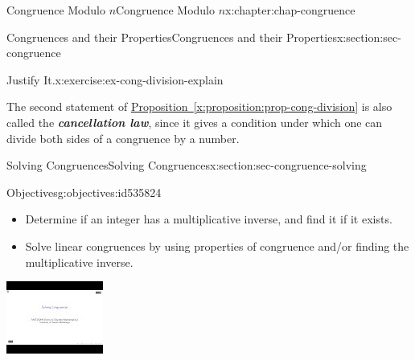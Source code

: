 \documentclass[oneside,10pt,]{book}
\newcommand{\xreffont}{\relax}
\newcommand{\alert}[1]{\textbf{\textit{#1}}}
\numberwithin{equation}{section}
\newlength{\qrsize}
\newlength{\previewwidth}
\begin{document}
\begin{chapterptx}{Congruence Modulo \(n\)}{}{Congruence Modulo \(n\)}{}{}{x:chapter:chap-congruence}
\begin{sectionptx}{Congruences and their Properties}{}{Congruences and their Properties}{}{}{x:section:sec-congruence}
\begin{inlineexercise}{Justify It.}{x:exercise:ex-cong-division-explain}
\end{inlineexercise}%
The second statement of \hyperref[x:proposition:prop-cong-division]{Proposition~{\xreffont\ref{x:proposition:prop-cong-division}}} is also called the \alert{cancellation law}, since it gives a condition under which one can divide both sides of a congruence by a number.%
\end{sectionptx}
%
%
\typeout{************************************************}
\typeout{************************************************}
%
\begin{sectionptx}{Solving Congruences}{}{Solving Congruences}{}{}{x:section:sec-congruence-solving}
\begin{objectives}{Objectives}{g:objectives:id535824}
%
\begin{itemize}[label=\textbullet]
\item{}Determine if an integer has a multiplicative inverse, and find it if it exists.%
\item{}Solve linear congruences by using properties of congruence and\slash{}or finding the multiplicative inverse.%
\end{itemize}
\end{objectives}
\begin{sidebyside}{1}{0}{0}{0}%
\begin{sbspanel}{1}%
\setlength{\qrsize}{9em}
\setlength{\previewwidth}{\linewidth}
\addtolength{\previewwidth}{-\qrsize}
\begin{tcbraster}[raster columns=2, raster column skip=1pt, raster halign=center, raster force size=false, raster left skip=0pt, raster right skip=0pt]%
\begin{tcolorbox}[previewstyle, width=\previewwidth]%
\includegraphics[width=0.80\linewidth,height=\qrsize,keepaspectratio]{images/video-solving-congruences.jpg}%

\end{tcolorbox}
\end{tcbraster}
\end{sbspanel}
\end{sidebyside}
\end{sectionptx}
\end{chapterptx}
\end{document}
